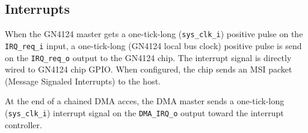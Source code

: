\documentclass[10pt,a4paper]{cerndoc}
\begin{document}
   \subsection{Interrupts}
   When the GN4124 master gets a one-tick-long (\verb+sys_clk_i+) positive pulse on the \verb+IRQ_req_i+ input, a one-tick-long (GN4124 local bus clock) positive pulse is send on the \verb+IRQ_req_o+ output to the GN4124 chip. The interrupt signal is directly wired to GN4124 chip GPIO. When configured, the chip sends an MSI packet (Message Signaled Interrupts) to the host.
   
   At the end of a chained DMA acces, the DMA master sends a one-tick-long (\verb+sys_clk_i+) interrupt signal on the \verb+DMA_IRQ_o+ output toward the interrupt controller.
\end{document}
